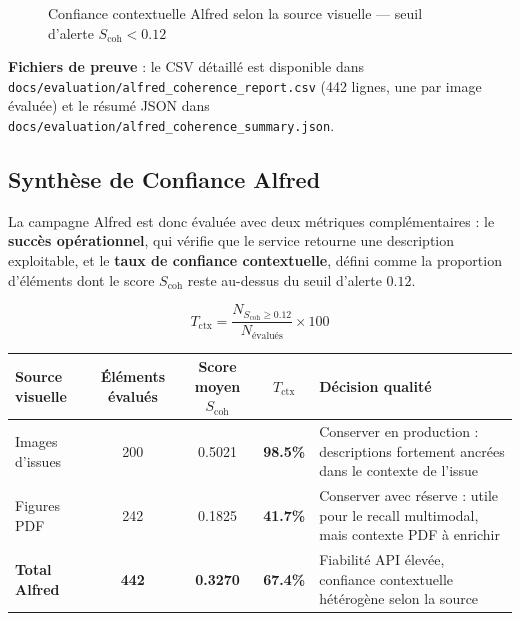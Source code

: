 \documentclass[12pt,a4paper]{report}
\begin{document}
\begin{figure}[H]
\centering
{}
\caption{Confiance contextuelle Alfred selon la source visuelle --- seuil d'alerte $S_{\text{coh}} < 0.12$}
\label{fig:alfred_contextual_trust}
\end{figure}

\textbf{Fichiers de preuve} : le CSV détaillé est disponible dans \texttt{docs/evaluation/alfred\_coherence\_report.csv} (442 lignes, une par image évaluée) et le résumé JSON dans \texttt{docs/evaluation/alfred\_coherence\_summary.json}.

\subsection{Synthèse de Confiance Alfred}
\label{sec:eval_alfred_synthesis}

La campagne Alfred est donc évaluée avec deux métriques complémentaires : le \textbf{succès opérationnel}, qui vérifie que le service retourne une description exploitable, et le \textbf{taux de confiance contextuelle}, défini comme la proportion d'éléments dont le score $S_{\text{coh}}$ reste au-dessus du seuil d'alerte $0.12$.

\begin{equation}
T_{\text{ctx}} = \frac{N_{S_{\text{coh}} \geq 0.12}}{N_{\text{évalués}}} \times 100
\label{eq:alfred_contextual_trust}
\end{equation}

\begin{longtable}{p{3cm}cccp{4.5cm}}
\toprule
\textbf{Source visuelle} & \textbf{Éléments évalués} & \textbf{Score moyen $S_{\text{coh}}$} & \textbf{$T_{\text{ctx}}$} & \textbf{Décision qualité} \\
\midrule
Images d'issues & 200 & 0.5021 & \textbf{98.5\%} & Conserver en production : descriptions fortement ancrées dans le contexte de l'issue \\
Figures PDF & 242 & 0.1825 & \textbf{41.7\%} & Conserver avec réserve : utile pour le recall multimodal, mais contexte PDF à enrichir \\
\midrule
\textbf{Total Alfred} & \textbf{442} & \textbf{0.3270} & \textbf{67.4\%} & Fiabilité API élevée, confiance contextuelle hétérogène selon la source \\
\bottomrule
\end{longtable}
\end{document}
